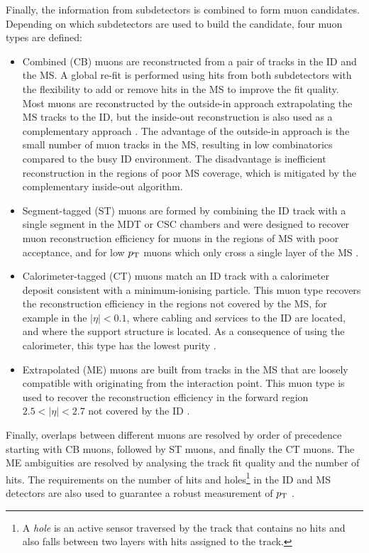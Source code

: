 Finally, the information from subdetectors is combined to form muon
candidates. Depending on which subdetectors are used to build the
candidate, four muon types are defined:
\begin{itemize}
\item Combined (CB) muons are reconstructed from a pair of tracks
in the ID and the MS. A global re-fit is performed using hits from 
both subdetectors with the flexibility to add or remove hits in the
MS to improve the fit quality. Most muons are reconstructed by the
outside-in approach extrapolating the MS tracks to the ID, but the
inside-out reconstruction is also used as a complementary approach 
\cite{Aad:2016jkr}. The advantage of the outside-in approach is the
small number of muon tracks in the MS, resulting in low combinatorics
compared to the busy ID environment. The disadvantage is inefficient
reconstruction in the regions of poor MS coverage, which is mitigated
by the complementary inside-out algorithm.
\item Segment-tagged (ST) muons are formed by combining the ID track
with a single segment in the MDT or CSC chambers and were designed
to recover muon reconstruction efficiency for muons in the regions of
MS with poor acceptance, and for low $p_{\text{T}}$ muons which
only cross a single layer of the MS \cite{Aad:2016jkr}.
\item Calorimeter-tagged (CT) muons match an ID track with a 
calorimeter deposit consistent with a minimum-ionising particle.
This muon type recovers the reconstruction efficiency in the regions
not covered by the MS, for example in the $|\eta|<0.1$, where cabling
and services to the ID are located, and where the support structure
is located. As a consequence of using the calorimeter, this type has
the lowest purity \cite{Aad:2016jkr}.
\item Extrapolated (ME) muons are built from tracks in the MS that
are loosely compatible with originating from the interaction point.
This muon type is used to recover the reconstruction efficiency in the 
forward region $2.5 < |\eta| < 2.7$ not covered by the ID \cite{Aad:2016jkr}.
\end{itemize}
Finally, overlaps between different muons are resolved by order of
precedence starting with CB muons, followed by ST muons, and
finally the CT muons. The ME ambiguities are resolved by analysing the
track fit quality and the number of hits.
The requirements on the number of hits and holes\footnote{A
\textit{hole} is an active sensor traversed by the
track that contains no hits and also falls between two layers with hits
assigned to the track.}
in the ID and MS detectors are also used to guarantee a robust
measurement of $p_{\text{T}}$ \cite{Aad:2016jkr}.

